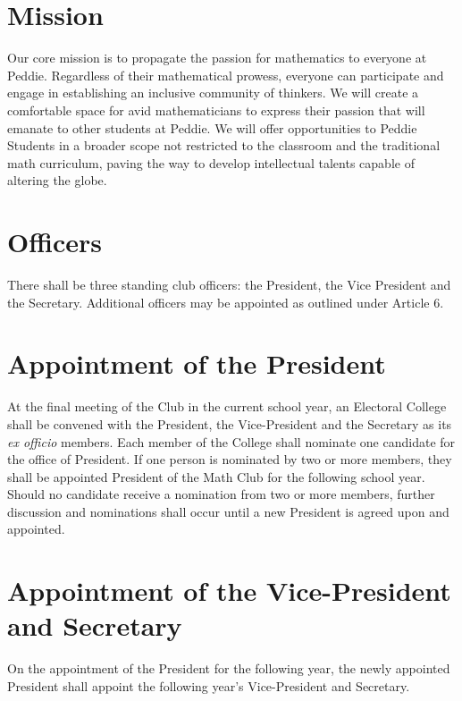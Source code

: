 \documentclass[12pt, letterpaper]{article}
\begin{document}
\section{Mission}
Our core mission is to propagate the passion for mathematics to everyone at Peddie. Regardless of their mathematical prowess, everyone can participate and engage in establishing an inclusive community of thinkers. We will create a comfortable space for avid mathematicians to express their passion that will emanate to other students at Peddie. We will offer opportunities to Peddie Students in a broader scope not restricted to the classroom and the traditional math curriculum, paving the way to develop intellectual talents capable of altering the globe. 

\section{Officers}
There shall be three standing club officers: the President, the Vice President and the Secretary. Additional officers may be appointed as outlined under Article 6.

\section{Appointment of the President}
At the final meeting of the Club in the current school year, an Electoral College shall be convened with the President, the Vice-President and the Secretary as its \textit{ex officio} members. Each member of the College shall nominate one candidate for the office of President. If one person is nominated by two or more members, they shall be appointed President of the Math Club for the following school year. Should no candidate receive a nomination from two or more members, further discussion and nominations shall occur until a new President is agreed upon and appointed.

\section{Appointment of the Vice-President and Secretary}
On the appointment of the President for the following year, the newly appointed President shall appoint the following year’s Vice-President and Secretary.
\end{document}
